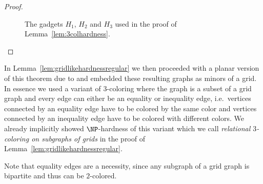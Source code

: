 \begin{proof}
\begin{figure}[tpb]
        \hskip 20pt
        \caption{The gadgets $H_1$, $H_2$ and $H_3$ used in the proof of Lemma~\ref{lem:3colhardness}.}
        \label{fig:3colgadgets}
    \end{figure}
\end{proof}

In Lemma~\ref{lem:gridlikehardnessregular} we then proceeded with a planar version of this theorem due to \cite{DBLP:journals/tcs/GareyJS76} and embedded these resulting graphs as minors of a grid.
In essence we used a variant of $3$-coloring where the graph is a subset of a grid graph and every edge can either be an equality or inequality edge, i.e.\ vertices connected by an equality edge have to be colored by the same color and vertices connected by an inequality edge have to be colored with different colors.
We already implicitly showed $\NP$-hardness of this variant which we call \emph{relational $3$-coloring on subgraphs of grids} in the proof of Lemma~\ref{lem:gridlikehardnessregular}.

Note that equality edges are a necessity, since any subgraph of a grid graph is bipartite and thus can be $2$-colored.

